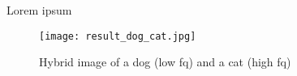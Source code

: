 \documentclass{rep}
\begin{document}
\vspace{-1cm}

\noindent Lorem ipsum \cite{oliva2006hybrid} \cite{nixon2008feature}

\printshorthands
\begingroup
\renewcommand{\cleardoublepage}{}
\renewcommand{\clearpage}{}
\printbibliography[heading=none] %
\endgroup

\begin{figure}[H]
  \centering
  \texttt{[image: result\_dog\_cat.jpg]}
  \caption{Hybrid image of a dog (low fq) and a cat (high fq)}
          \label{fig:three}
\end{figure}


\end{document}
